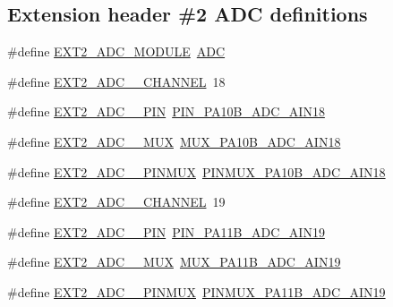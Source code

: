 \subsection*{Extension header \#2 A\+DC definitions}
\begin{DoxyCompactItemize}
\item 
\#define \mbox{\hyperlink{group__samd21__xplained__pro__features__group_ga9010f529277220ee12166f86eb2cbd77}{E\+X\+T2\+\_\+\+A\+D\+C\+\_\+\+M\+O\+D\+U\+LE}}~\mbox{\hyperlink{group___s_a_m_d21_j18_a__base_ga54d148b91f3d356713f7e367a2243bea}{A\+DC}}
\item 
\#define \mbox{\hyperlink{group__samd21__xplained__pro__features__group_gac46d44c1224546dda77724af026f4a27}{E\+X\+T2\+\_\+\+A\+D\+C\+\_\+\_\+\+C\+H\+A\+N\+N\+EL}}~18
\item 
\#define \mbox{\hyperlink{group__samd21__xplained__pro__features__group_ga91f8a002fe07f9858fa21ef5c05e905f}{E\+X\+T2\+\_\+\+A\+D\+C\+\_\+\_\+\+P\+IN}}~\mbox{\hyperlink{pio_2samd21j18a_8h_af594515430ee7cd9c6c02e6b5dfa5822}{P\+I\+N\+\_\+\+P\+A10\+B\+\_\+\+A\+D\+C\+\_\+\+A\+I\+N18}}
\item 
\#define \mbox{\hyperlink{group__samd21__xplained__pro__features__group_ga7c279841395aceddf661ac7dc3daadc9}{E\+X\+T2\+\_\+\+A\+D\+C\+\_\+\_\+\+M\+UX}}~\mbox{\hyperlink{pio_2samd21j18a_8h_a254143856bcff25ceaf8c59f14ab0fa1}{M\+U\+X\+\_\+\+P\+A10\+B\+\_\+\+A\+D\+C\+\_\+\+A\+I\+N18}}
\item 
\#define \mbox{\hyperlink{group__samd21__xplained__pro__features__group_gaef2648c27f78e4c998c2739506d4e478}{E\+X\+T2\+\_\+\+A\+D\+C\+\_\+\_\+\+P\+I\+N\+M\+UX}}~\mbox{\hyperlink{pio_2samd21j18a_8h_a5f3b1389353e64b6d4ce442555f7daa5}{P\+I\+N\+M\+U\+X\+\_\+\+P\+A10\+B\+\_\+\+A\+D\+C\+\_\+\+A\+I\+N18}}
\item 
\#define \mbox{\hyperlink{group__samd21__xplained__pro__features__group_ga934979148a3c74d392b0f3970721880c}{E\+X\+T2\+\_\+\+A\+D\+C\+\_\+\_\+\+C\+H\+A\+N\+N\+EL}}~19
\item 
\#define \mbox{\hyperlink{group__samd21__xplained__pro__features__group_gaf4cd3ff8f43d22ce11edfe40b02d0498}{E\+X\+T2\+\_\+\+A\+D\+C\+\_\+\_\+\+P\+IN}}~\mbox{\hyperlink{pio_2samd21j18a_8h_a5f56dda410dca398fa92679ce6b01c46}{P\+I\+N\+\_\+\+P\+A11\+B\+\_\+\+A\+D\+C\+\_\+\+A\+I\+N19}}
\item 
\#define \mbox{\hyperlink{group__samd21__xplained__pro__features__group_ga7de3785c01df710fbe80244bca6eb130}{E\+X\+T2\+\_\+\+A\+D\+C\+\_\+\_\+\+M\+UX}}~\mbox{\hyperlink{pio_2samd21j18a_8h_a1c9d3ee528e4d137cb344ec37f78b536}{M\+U\+X\+\_\+\+P\+A11\+B\+\_\+\+A\+D\+C\+\_\+\+A\+I\+N19}}
\item 
\#define \mbox{\hyperlink{group__samd21__xplained__pro__features__group_ga32513ceb498b89de9facdcba65c559ca}{E\+X\+T2\+\_\+\+A\+D\+C\+\_\+\_\+\+P\+I\+N\+M\+UX}}~\mbox{\hyperlink{pio_2samd21j18a_8h_a0c5a5cba5dbc784a96555e1b733ccb22}{P\+I\+N\+M\+U\+X\+\_\+\+P\+A11\+B\+\_\+\+A\+D\+C\+\_\+\+A\+I\+N19}}
\end{DoxyCompactItemize}
